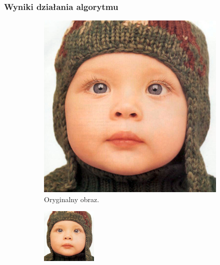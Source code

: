 \documentclass[a4paper,11pt, notitlepage ]{article}
\begin{document}
\subsubsection{Wyniki działania algorytmu}
\begin{figure}[h!]
	\centering
	\begin{subfigure}[b]{0.4\linewidth}
		\includegraphics[width=\linewidth]{baby_GT.png}
		\caption{Oryginalny obraz.}
	\end{subfigure}
	\begin{subfigure}[b]{0.4\linewidth}
		\includegraphics[width=\linewidth]{SRGAN/test.png}

\end{subfigure}
\end{figure}
\end{document}
